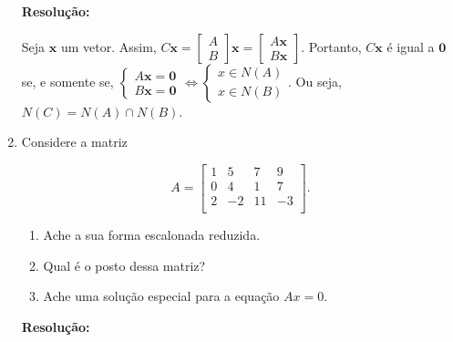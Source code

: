 \documentclass[leqno]{article}
\begin{document}
\begin{enumerate}
    \textbf{Resolução:}

    Seja $\textbf{x}$ um vetor. Assim, $C\textbf{x}=\begin{bmatrix}
    A\\
    B
    \end{bmatrix}\textbf{x}=\begin{bmatrix}
    A\textbf{x}\\
    B\textbf{x}
    \end{bmatrix}$. Portanto, $C\textbf{x}$ é igual a $\textbf{0}$ se, e somente se, $\begin{cases}A\textbf{x}=\textbf{0}\\B\textbf{x}=\textbf{0}\end{cases}\iff\begin{cases}x\in N(A)\\x\in N(B)\end{cases}$. Ou seja, $N(C)=N(A)\cap N(B)$.
    
    \item Considere a matriz
    
    $$A=\begin{bmatrix}
    1 & 5 & 7 & 9\\
    0 & 4 & 1 & 7\\
    2 & -2 & 11 & -3\\
    \end{bmatrix}\text{.}$$
    
    \begin{enumerate}
        \item Ache a sua forma escalonada reduzida.
        
        \item Qual é o posto dessa matriz?
        
        \item Ache uma solução especial para a equação $Ax=0$.
    \end{enumerate}
    
    \textbf{Resolução:}
    

\end{enumerate}
\end{document}
